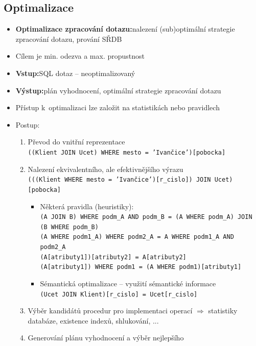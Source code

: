 \documentclass[a4paper,10pt]{article}
\newcommand{\pojem}[2]{\item \textbf{#1:}\quad #2}
\newcommand{\tedy}{$\Rightarrow$ }
\begin{document}
    \subsection{Optimalizace}
      \begin{itemize}
        \pojem{Optimalizace zpracování dotazu}{nalezení (sub)optimální strategie zpracování dotazu, prování SŘDB}
        \item Cílem je min. odezva a max. propustnost
        \pojem{Vstup}{SQL dotaz -- neoptimalizovaný}
        \pojem{Výstup}{plán vyhodnocení, optimální strategie zpracování dotazu}
        \item Přístup k~optimalizaci lze založit na statistikách nebo pravidlech
        \item Postup:
        \begin{enumerate}
          \item Převod do vnitřní reprezentace \\
          \texttt{((Klient JOIN Ucet) WHERE mesto = 'Ivančice')[pobocka]}
          \item Nalezení ekvivalentního, ale efektivnějšího výrazu \\
          \texttt{(((Klient WHERE mesto = 'Ivančice')[r\_cislo]) JOIN Ucet)[pobocka]}
          \begin{itemize}
            \item Některá pravidla (heuristiky): \\
            \texttt{(A JOIN B) WHERE podm\_A AND podm\_B = (A WHERE podm\_A) JOIN (B WHERE podm\_B)} \\
            \texttt{(A WHERE podm1\_A) WHERE podm2\_A = A WHERE podm1\_A AND podm2\_A} \\
            \texttt{(A[atributy1])[atributy2] = A[atributy2]} \\
            \texttt{(A[atributy1]) WHERE podm1 = (A WHERE podm1)[atributy1]}
            \item Sémantická optimalizace -- využití sémantické informace \\
            \texttt{(Ucet JOIN Klient)[r\_cislo] = Ucet[r\_cislo]}
          \end{itemize}
          \item Výběr kandidátů procedur pro implementaci operací \tedy statistiky databáze, existence indexů, shlukování, ...
          \item Generování plánu vyhodnocení a výběr nejlepšího
        \end{enumerate}
      \end{itemize}
\end{document}

